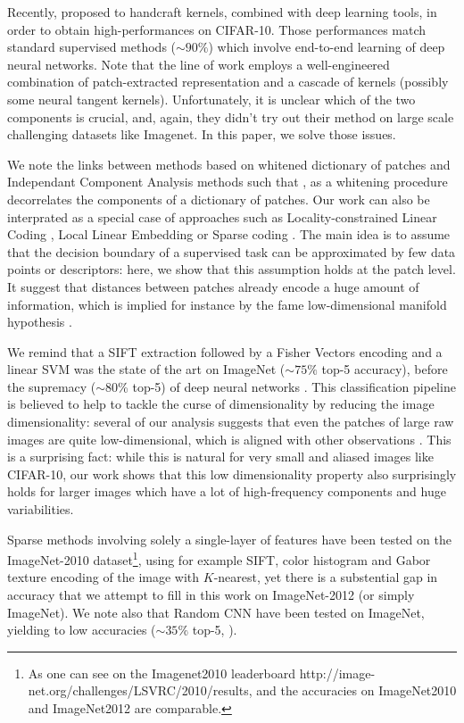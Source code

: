 \documentclass{article}
\begin{document}
Recently, \citep{li2019enhanced,shankar2020neural} proposed to handcraft kernels, combined with deep learning tools, in order to obtain high-performances on CIFAR-10.
Those performances  match standard supervised methods ($\sim 90\%$) which involve end-to-end learning of deep neural networks.
Note that the line of work \citep{li2019enhanced,shankar2020neural,mairal2016end} employs a well-engineered combination of patch-extracted representation and a cascade of kernels (possibly some neural tangent kernels).
Unfortunately, it is unclear which of the two components is crucial, and, again, they didn't try out their method on large scale challenging datasets like Imagenet.
In this paper, we solve those issues.

We  note the links between methods based on whitened dictionary of patches and Independant Component Analysis methods such that \citep{ngiam2010tiled}, as a whitening procedure decorrelates the components of a dictionary of patches. Our work can also be interprated as a special case of approaches such as Locality-constrained Linear Coding \citep{russakovsky2015imagenet,yu2010improved}, Local Linear Embedding \citep{Roweis2323} or Sparse coding \citep{bo2013multipath}. The main idea is to assume that the  decision boundary of a supervised task can be approximated by few data points or descriptors: here, we show that this assumption holds at the patch level. It suggest that distances between patches already encode a huge amount of information, which is implied for instance by the fame low-dimensional manifold hypothesis 
\citep{fefferman2016testing}. 

We remind that a SIFT extraction \cite{lowe2004distinctive} followed by a Fisher Vectors  encoding \citep{sanchez2013image} and a linear SVM was the state of the art on ImageNet ($\sim 75\% $ top-5 accuracy), before the supremacy ($\sim 80$\% top-5) of deep neural networks \citet{krizhevsky2012imagenet}. This classification pipeline is believed to help to tackle the curse of dimensionality by reducing the image dimensionality: several of our analysis  suggests that even the patches of large raw images are quite low-dimensional, which is aligned with other observations
\citep{Oyallon_2017_CVPR}. This is a surprising fact: while this is natural for very small and aliased  images like CIFAR-10, our work shows that this low dimensionality property also surprisingly holds for larger images which have a lot of high-frequency components and huge variabilities.

Sparse methods involving solely a single-layer of  features  have been tested on the ImageNet-2010 dataset\footnote{ As one can see on the Imagenet2010 leaderboard http://image-net.org/challenges/LSVRC/2010/results, and the accuracies on ImageNet2010 and ImageNet2012 are comparable.}, using for example SIFT, color histogram and Gabor texture encoding of the image with $K$-nearest, yet there is a substential gap in accuracy that we attempt to fill in this work on ImageNet-2012 (or simply ImageNet). We note also that Random CNN have been tested on ImageNet, yielding to low accuracies ($\sim 35\%$ top-5, \citep{arandjelovic2017look}).
\end{document}
